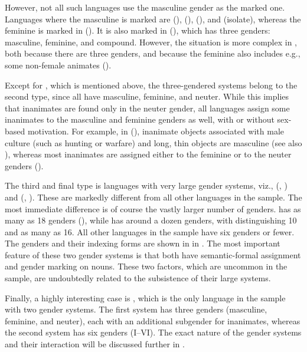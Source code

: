 \documentclass[output=collectionpaper]{langsci/langscibook}
\begin{document}
However, not all such languages use the masculine gender as the marked one. Languages where the masculine is marked are  (),  (),  (), and  (isolate), whereas the feminine is marked in  (). It is also marked in  (), which has three genders: masculine, feminine, and compound. However, the situation is more complex in , both because there are three genders, and because the feminine also includes e.g., some non-female animates (\citealt[68]{Arsjoe1999}).

Except for , which is mentioned above, the three-gendered systems belong to the second type, since all have masculine, feminine, and neuter. While this implies that inanimates are found only in the neuter gender, all languages assign some inanimates to the masculine and feminine genders as well, with or without sex-based motivation. For example, in  (), inanimate objects associated with male culture (such as hunting or warfare) and long, thin objects are masculine (see also ), whereas most inanimates are assigned either to the feminine or to the neuter genders (\citealt[46--48]{Robinson2011}).

The third and final type is languages with very large gender systems, viz.,  (, ) and  (, ). These are markedly different from all other languages in the sample. The most immediate difference is of course the vastly larger number of genders.  has as many as 18 genders (\citealt[8--10]{Conrad1991}), while  has around a dozen genders, with \citet[119]{Foley1991} distinguishing 10 and \citet[175]{Phillips1993} as many as 16. All other languages in the sample have six genders or fewer. The  genders and their indexing forms are shown in  in . The most important feature of these two gender systems is that both have semantic-formal assignment and gender marking on nouns. These two factors, which are uncommon in the sample, are undoubtedly related to the subsistence of their large systems.

Finally, a highly interesting case is , which is the only language in the sample with two gender systems. The first system has three genders (masculine, feminine, and neuter), each with an additional subgender for inanimates, whereas the second system has six genders (I--VI). The exact nature of the gender systems and their interaction will be discussed further in .
\end{document}
